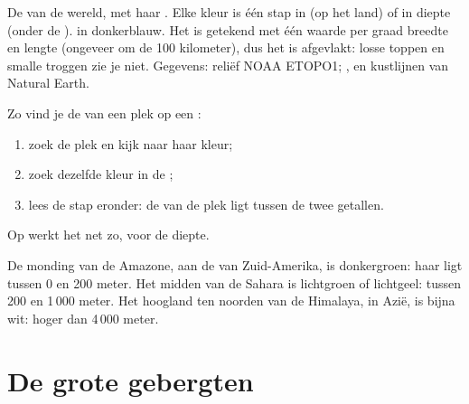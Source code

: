 \begin{omfigure}
{\small De  van de wereld, met haar . Elke kleur
is één stap in  (op het land) of in diepte (onder de ). 
in donkerblauw. Het  is getekend met één waarde per graad
breedte en lengte (ongeveer om de 100 kilometer), dus het is afgevlakt:
losse toppen en smalle troggen zie je niet. Gegevens: reliëf NOAA ETOPO1;
,  en kustlijnen van Natural Earth.}
\label{fig:g4:world-physical-map:map}
\end{omfigure}

\begin{method}\label{met:g4:world-physical-map:reading}
Zo vind je de  van een plek op een :
\begin{enumerate}
  \item zoek de plek en kijk naar haar kleur;
  \item zoek dezelfde kleur in de ;
  \item lees de stap eronder: de  van de plek ligt tussen de twee
        getallen.
\end{enumerate}
Op  werkt het net zo, voor de diepte.
\end{method}

\begin{example}\label{ex:g4:world-physical-map:three}
De monding van de Amazone, aan de  van Zuid-Amerika, is donkergroen:
haar  ligt tussen 0 en 200 meter. Het midden van de Sahara is
lichtgroen of lichtgeel: tussen 200 en 1\,000 meter. Het hoogland ten
noorden van de Himalaya, in Azië, is bijna wit: hoger dan 4\,000 meter.
\end{example}

\section{De grote gebergten}

